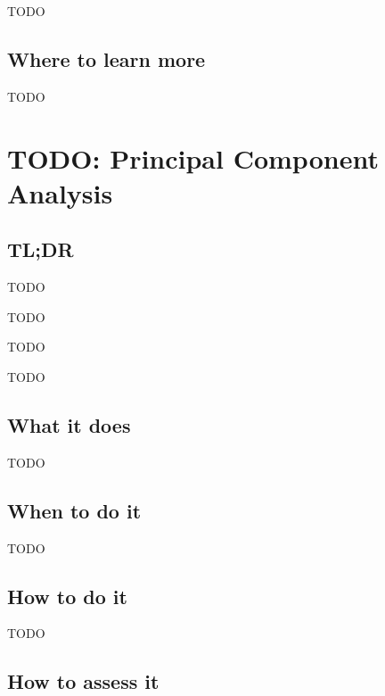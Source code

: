 \documentclass[
]{book}
\providecommand{\tightlist}{%
  \setlength{\itemsep}{0pt}\setlength{\parskip}{0pt}}
\begin{document}
TODO

\hypertarget{where-to-learn-more-19}{%
\section{Where to learn more}\label{where-to-learn-more-19}}

TODO

\hypertarget{principal-component-analysis}{%
\chapter{TODO: Principal Component Analysis}\label{principal-component-analysis}}

\hypertarget{tldr-20}{%
\section{TL;DR}\label{tldr-20}}

\begin{description}
\tightlist
\item[What it does]
TODO
\item[When to do it]
TODO
\item[How to do it]
TODO
\item[How to assess it]
TODO
\end{description}

\hypertarget{what-it-does-20}{%
\section{What it does}\label{what-it-does-20}}

TODO

\hypertarget{when-to-do-it-20}{%
\section{When to do it}\label{when-to-do-it-20}}

TODO

\hypertarget{how-to-do-it-20}{%
\section{How to do it}\label{how-to-do-it-20}}

TODO

\hypertarget{how-to-assess-it-20}{%
\section{How to assess it}\label{how-to-assess-it-20}}
\end{document}
